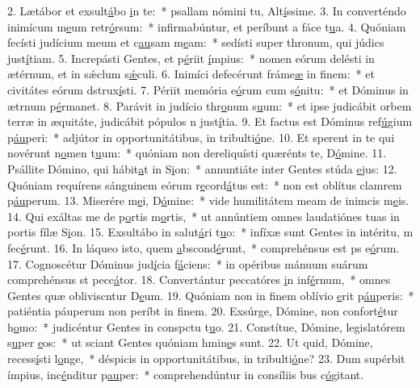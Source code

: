 2. Lætábor et exsult\uline{á}bo \uline{i}n te:~* psallam nómini tu, Alt\uline{í}ssime.
3. In converténdo inimícum m\uline{e}um retr\uline{ó}rsum:~* infirmabúntur, et períbunt a fáce t\uline{u}a.
4. Quóniam fecísti judícium meum et c\uline{au}sam m\uline{e}am:~* sedísti super thronum, qui júdics just\uline{í}tiam.
5. Increpásti Gentes, et p\uline{é}riit \uline{í}mpius:~* nomen eórum delésti in ætérnum, et in sǽclum s\uline{ǽ}culi.
6. Inimíci defecérunt fráme\uline{æ} in f\uline{i}nem:~* et civitátes eórum dstrux\uline{í}sti.
7. Périit memória e\uline{ó}rum cum s\uline{ó}nitu:~* et Dóminus in ætrnum p\uline{é}rmanet.
8. Parávit in judício thr\uline{o}num s\uline{u}um:~* et ipse judicábit orbem terræ in æquitáte, judicábit pópulos n just\uline{í}tia.
9. Et factus est Dóminus ref\uline{ú}gium p\uline{áu}peri:~* adjútor in opportunitátibus, in tribulti\uline{ó}ne.
10. Et sperent in te qui novérunt n\uline{o}men t\uline{u}um:~* quóniam non dereliquísti quærénts te, D\uline{ó}mine.
11. Psállite Dómino, qui hábit\uline{a}t in S\uline{i}on:~* annuntiáte inter Gentes stúda \uline{e}jus:
12. Quóniam requírens sánguinem eórum r\uline{e}cord\uline{á}tus est:~* non est oblítus clamrem p\uline{áu}perum.
13. Miserére m\uline{e}i, D\uline{ó}mine:~* vide humilitátem meam de inimcis m\uline{e}is.
14. Qui exáltas me de p\uline{o}rtis m\uline{o}rtis,~* ut annúntiem omnes laudatiónes tuas in portis fílæ S\uline{i}on.
15. Exsultábo in salut\uline{á}ri t\uline{u}o:~* infíxæ sunt Gentes in intéritu, m fec\uline{é}runt.
16. In láqueo isto, quem \uline{a}bscond\uline{é}runt,~* comprehénsus est ps e\uline{ó}rum.
17. Cognoscétur Dóminus jud\uline{í}cia f\uline{á}ciens:~* in opéribus mánuum suárum comprehénsus st pecc\uline{á}tor.
18. Convertántur peccatóres \uline{i}n inf\uline{é}rnum,~* omnes Gentes quæ obliviscntur D\uline{e}um.
19. Quóniam non in finem oblívio \uline{e}rit p\uline{áu}peris:~* patiéntia páuperum non períbt in f\uline{i}nem.
20. Exsúrge, Dómine, non confort\uline{é}tur h\uline{o}mo:~* judicéntur Gentes in conspctu t\uline{u}o.
21. Constítue, Dómine, legislatórem s\uline{u}per \uline{e}os:~* ut sciant Gentes quóniam hmin\uline{e}s sunt.
22. Ut quid, Dómine, recess\uline{í}sti l\uline{o}nge,~* déspicis in opportunitátibus, in tribulti\uline{ó}ne?
23. Dum supérbit ímpius, inc\uline{é}nditur p\uline{au}per:~* comprehendúntur in consíliis bus c\uline{ó}gitant.
